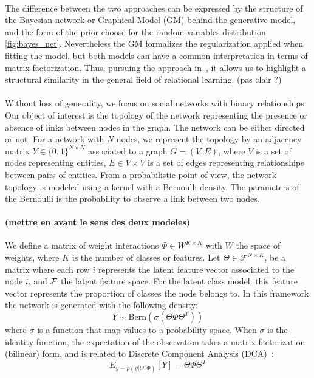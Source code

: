 \documentclass[a4paper, 12pt]{article}
\begin{document}
\paragraph{}
The difference between the two approaches can be expressed by the structure of the Bayesian network or Graphical Model (GM) behind the generative model, and the form of the prior choose for the random variables distribution \ref{fig:bayes_net}. Nevertheless the GM formalizes the regularization applied when fitting the model, but both models can have a common interpretation in terms of matrix factorization. Thus, pursuing the approach in~\cite{DCA}, it allows us to highlight a structural similarity in the general field of relational learning. (pas clair ?)

\paragraph{}
Without loss of generality, we focus on social networks with binary relationships. Our object of interest is the topology of the network representing the presence or absence of links between nodes in the graph. The network can be either directed or not. For a network with $N$ nodes, we represent the topology by an adjacency matrix $Y \in \{0,1\}^{N\times N}$ associated to a graph $G = (V,E)$, where $V$ is a set of nodes representing entities, $E \in V \times V$ is a set of edges representing relationships between pairs of entities. From a probabilistic point of view, the network topology is modeled using a kernel with a Bernoulli density. The parameters of the Bernoulli is the probability to observe a link between two nodes.

\paragraph{(mettre en avant le sens des deux modeles)}
We define a matrix of weight interactions $\Phi \in W^{K\times K}$ with $W$ the space of weights, where $K$ is the number of classes or features. Let $\Theta \in \mathcal{F}^{N\times K}$, be a matrix where each row $i$ represents the latent feature vector associated to the node $i$,  and $\cal{F}$ the latent feature space. For the latent class model, this feature vector represents the proportion of classes the node belongs to. In this framework the network is generated with the following density:
\begin{equation}
    Y \sim \mathrm{Bern}(\sigma(\Theta \Phi  \Theta^T))
\end{equation}
where $\sigma$ is a function that map values to a probability space. When $\sigma$ is the identity function, the expectation of the observation takes a matrix factorization (bilinear) form, and is related to Discrete Component Analysis (DCA)~\cite{DCA}:
\begin{equation}
E_{y \sim p(y|\Theta, \Phi)}[Y] = \Theta \Phi  \Theta^T
\end{equation}
\end{document}
